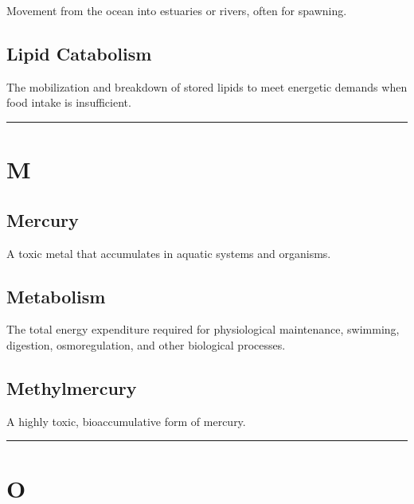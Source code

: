 \documentclass[
]{book}
\begin{document}
Movement from the ocean into estuaries or rivers, often for spawning.

\subsection{\texorpdfstring{\textbf{Lipid Catabolism}}{Lipid Catabolism}}\label{lipid-catabolism}

The mobilization and breakdown of stored lipids to meet energetic demands when food intake is insufficient.

\begin{center}\rule{0.5\linewidth}{0.5pt}\end{center}

\section*{M}\label{m}

\subsection{\texorpdfstring{\textbf{Mercury}}{Mercury}}\label{mercury}

A toxic metal that accumulates in aquatic systems and organisms.

\subsection{\texorpdfstring{\textbf{Metabolism}}{Metabolism}}\label{metabolism-1}

The total energy expenditure required for physiological maintenance, swimming, digestion, osmoregulation, and other biological processes.

\subsection{\texorpdfstring{\textbf{Methylmercury}}{Methylmercury}}\label{methylmercury}

A highly toxic, bioaccumulative form of mercury.

\begin{center}\rule{0.5\linewidth}{0.5pt}\end{center}

\section*{O}\label{o}
\end{document}
